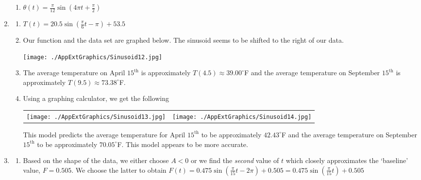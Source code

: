 \begin{enumerate}
\begin{multicols}{2}
\begin{enumerate}
\item  $\theta(t) = \frac{\pi}{12} \sin\left(4\pi t + \frac{\pi}{2}\right)$
\end{enumerate}
\end{multicols}

\item  \begin{enumerate} \item  $T(t) = 20.5 \sin\left(\frac{\pi}{6} t - \pi\right) + 53.5$ 

\item  Our function and the data set are graphed below.  The sinusoid seems to be shifted to the right of our data.

\begin{center}

 \texttt{[image: ./AppExtGraphics/Sinusoid12.jpg]} 

\end{center}

\item The average temperature on April $15^{\text{th}}$ is approximately $T(4.5) \approx 39.00^{\circ}$F and the average temperature on September $15^{\text{th}}$ is approximately $T(9.5) \approx 73.38^{\circ}$F.

\item  Using a graphing calculator, we get the following

\begin{center}

\begin{tabular}{cc}

\texttt{[image: ./AppExtGraphics/Sinusoid13.jpg]} &
\hspace{0.75in}  \texttt{[image: ./AppExtGraphics/Sinusoid14.jpg]}  \\

\end{tabular}

\end{center}

This model predicts the average temperature for April $15^{\text{th}}$ to be approximately $42.43^{\circ}$F and the average temperature on September $15^{\text{th}}$ to be approximately $70.05^{\circ}$F.  This model appears to be more accurate.

\end{enumerate}


\item  \begin{enumerate} \item  Based on the shape of the data, we either choose $A<0$ or we find the \textit{second} value of $t$ which closely approximates the `baseline' value, $F = 0.505$.  We choose the latter to obtain $F(t) = 0.475 \sin\left(\frac{\pi}{15} t - 2\pi \right) + 0.505 =  0.475 \sin\left(\frac{\pi}{15} t\right) + 0.505$ 


\end{enumerate}
\end{enumerate}
